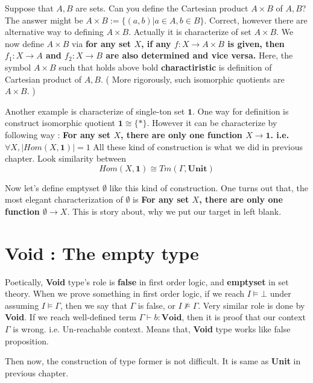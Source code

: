 \documentclass[12pt, a4paper, openany, twoside]{book}
\theoremstyle{definition}
\theoremstyle{remark}
\theoremstyle{plain}
\numberwithin{equation}{section}
\begin{document}
Suppose that $A, B$ are sets. Can you define the Cartesian product $A \times B$ of $A, B$? 
The answer might be $A \times B := \{(a, b) | a \in A , b \in B\}$. Correct, however there are alternative way to defining $A \times B$. Actually it is characterize of set $A \times B$. 
We now define $A \times B$ via \textbf{for any set $X$, if any $f : X \rightarrow A \times B$ is given, 
then $f_1 : X \rightarrow A$ and $f_2 : X \rightarrow B$ are also determined and vice versa.} 
Here, the symbol $A \times B$ such that holds above bold \textbf{charactiristic} is definition of Cartesian product of $A, B$. 
( More rigorously, such isomorphic quotients are $A \times B$. )

Another example is characterize of single-ton set $\mathbf{1}$. One way for definition is construct isomorphic quotient 
$\mathbf{1} \cong \{*\}$. However it can be characterize by following way : \textbf{For any set $X$, there are only one function $X \rightarrow \mathbf{1}$. i.e. $\forall X, |Hom(X, \mathbf{1})| = 1$}
All these kind of construction is what we did in previous chapter. Look similarity between 
\[Hom(X, \mathbf{1}) \cong Tm(\Gamma, \mathbf{Unit})\]

Now let's define emptyset $\emptyset$ like this kind of construction. One turns out that, the most elegant characterization of $\emptyset$ is 
\textbf{For any set $X$, there are only one function $\emptyset \rightarrow X$}. This is story about, 
why we put our target in left blank. 

\newpage 

\section{Void : The empty type}

Poetically, \textbf{Void} type's role is \textbf{false} in first order logic, and \textbf{emptyset} in set theory. 
When we prove something in first order logic, if we reach $ I \models \bot$ under assuming $I \models \Gamma$, 
then we say that $\Gamma$ is false, or $I \not\models \Gamma$. Very similar role is done by \textbf{Void}. 
If we reach well-defined term $\Gamma \vdash b : \mathbf{Void}$, then it is proof that our context $\Gamma$ is wrong. i.e. Un-reachable context. 
Means that, \textbf{Void} type works like false proposition. 

Then now, the construction of type former is not difficult. It is same as \textbf{Unit} in previous chapter. 
\end{document}
